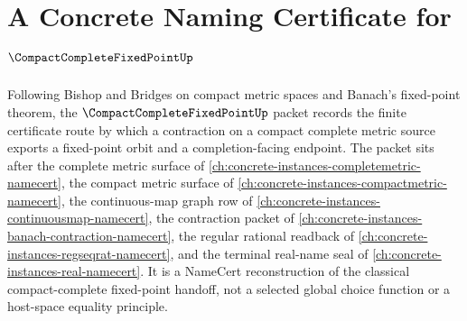 \chapter{A Concrete Naming Certificate for $\CompactCompleteFixedPointUp$}
\label{ch:concrete-instances-compact-complete-fixed-point-namecert}

Following Bishop and Bridges on compact metric spaces and Banach's fixed-point theorem, the $\CompactCompleteFixedPointUp$ packet records the finite certificate route by which a contraction on a compact complete metric source exports a fixed-point orbit and a completion-facing endpoint. The packet sits after the complete metric surface of \autoref{ch:concrete-instances-completemetric-namecert}, the compact metric surface of \autoref{ch:concrete-instances-compactmetric-namecert}, the continuous-map graph row of \autoref{ch:concrete-instances-continuousmap-namecert}, the contraction packet of \autoref{ch:concrete-instances-banach-contraction-namecert}, the regular rational readback of \autoref{ch:concrete-instances-regseqrat-namecert}, and the terminal real-name seal of \autoref{ch:concrete-instances-real-namecert}. It is a NameCert reconstruction of the classical compact-complete fixed-point handoff, not a selected global choice function or a host-space equality principle.

